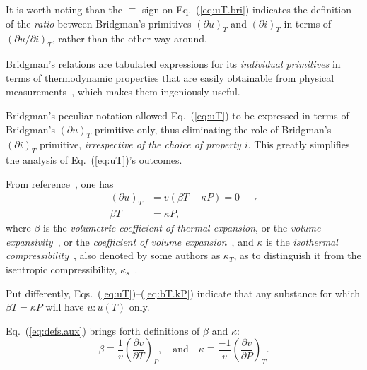 \documentclass[fleqn,11pt]{SelfArx}
\newcommand{\parxyz}[3]{\left(\frac{\partial {{#1}}}{\partial {{#2}}}\right)_{\!\!\!{#3}}}
\newcommand{\inlxyz}[3]{({\partial {{#1}}}/{\partial {{#2}}})_{{#3}}}
\newcommand{\bri}[2]{(\partial {{#1}})_{{#2}}}
\begin{document}
    It is worth noting than the $\equiv$ sign on Eq.~(\ref{eq:uT.bri}) indicates the  definition
    of the \emph{ratio} between Bridgman's primitives $\bri  uT$  and  $\bri  iT$  in  terms  of
    $\inlxyz uiT$, rather than the other way around.

    Bridgman's relations are tabulated expressions for its \emph{individual primitives} in terms
    of    thermodynamic    properties    that    are    easily    obtainable    from    physical
    measurements~\cite{2006-BejanA-Wiley}, which makes them ingeniously useful.

    Bridgman's  peculiar  notation  allowed  Eq.~(\ref{eq:uT})  to  be  expressed  in  terms  of
    Bridgman's $\bri uT$ primitive only, thus eliminating  the  role  of  Bridgman's  $\bri  iT$
    primitive, \emph{irrespective of the choice of property $i$}. This  greatly  simplifies  the
    analysis of Eq.~(\ref{eq:uT})'s outcomes.

    From reference~\cite{2006-BejanA-Wiley}, one has
    \begin{align}
        \bri uT & = v(\beta T - \kappa P) = 0 & \rightharpoondown \\
        \beta T & = \kappa P,
        \label{eq:bT.kP}
    \end{align}
    \noindent where $\beta$ is the \emph{volumetric coefficient of thermal  expansion},  or  the
    \emph{volume  expansivity}~\cite{2006-BejanA-Wiley},  or  the  \emph{coefficient  of  volume
    expansion}~\cite{1986-JonesJB+HawkinsGA-Wiley},  and  $\kappa$   is   the   \emph{isothermal
    compressibility}~\cite{2006-BejanA-Wiley}, also denoted by some authors as $\kappa_T$, as to
    distinguish         it         from         the         isentropic          compressibility,
    $\kappa_s$~\cite{1986-JonesJB+HawkinsGA-Wiley}.

    Put differently, Eqs.~(\ref{eq:uT})--(\ref{eq:bT.kP}) indicate that any substance for  which
    $\beta T = \kappa P$ will have $u\!:\!u(T)$ only.

    Eq.~(\ref{eq:defs.aux}) brings forth definitions of $\beta$ and $\kappa$:
    \begin{equation}
        \beta  \equiv \frac{1}{v}\parxyz vTP, \quad\mbox{and}\quad
        \kappa \equiv \frac{-1}{v}\parxyz vPT.
        \label{eq:defs.aux}
    \end{equation}
\end{document}
